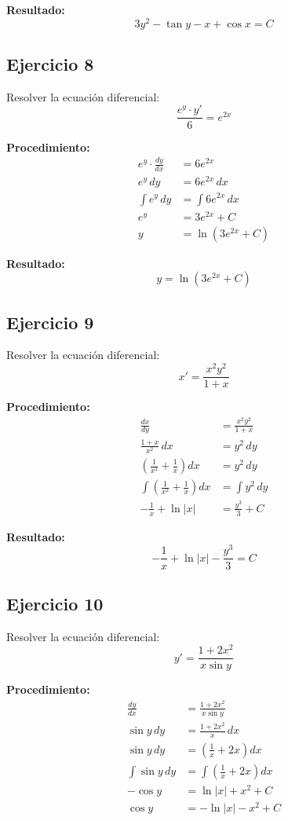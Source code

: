 \documentclass[12pt]{article}
\begin{document}
\textbf{Resultado:}
\[
3y^2 - \tan y - x + \cos x = C
\]

\subsection*{Ejercicio 8}
Resolver la ecuación diferencial:
\[
\frac{e^y \cdot y'}{6} = e^{2x}
\]

\textbf{Procedimiento:}
\begin{align*}
e^y \cdot \frac{dy}{dx} &= 6e^{2x} \\
e^y\,dy &= 6e^{2x}\,dx \\
\int e^y\,dy &= \int 6e^{2x}\,dx \\
e^y &= 3e^{2x} + C \\
y &= \ln(3e^{2x} + C)
\end{align*}

\textbf{Resultado:}
\[
y = \ln(3e^{2x} + C)
\]

\subsection*{Ejercicio 9}
Resolver la ecuación diferencial:
\[
x' = \frac{x^2 y^2}{1+x}
\]

\textbf{Procedimiento:}
\begin{align*}
\frac{dx}{dy} &= \frac{x^2 y^2}{1+x} \\
\frac{1+x}{x^2}\,dx &= y^2\,dy \\
\left(\frac{1}{x^2} + \frac{1}{x}\right)dx &= y^2\,dy \\
\int \left(\frac{1}{x^2} + \frac{1}{x}\right)dx &= \int y^2\,dy \\
-\frac{1}{x} + \ln|x| &= \frac{y^3}{3} + C
\end{align*}

\textbf{Resultado:}
\[
-\frac{1}{x} + \ln|x| - \frac{y^3}{3} = C
\]

\subsection*{Ejercicio 10}
Resolver la ecuación diferencial:
\[
y' = \frac{1+2x^2}{x\sin y}
\]

\textbf{Procedimiento:}
\begin{align*}
\frac{dy}{dx} &= \frac{1+2x^2}{x\sin y} \\
\sin y\,dy &= \frac{1+2x^2}{x}\,dx \\
\sin y\,dy &= \left(\frac{1}{x} + 2x\right)dx \\
\int \sin y\,dy &= \int \left(\frac{1}{x} + 2x\right)dx \\
-\cos y &= \ln|x| + x^2 + C \\
\cos y &= -\ln|x| - x^2 + C
\end{align*}
\end{document}

